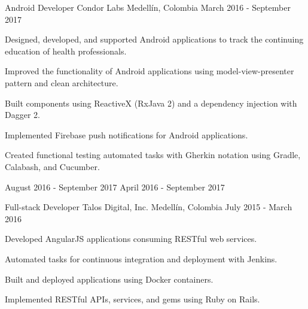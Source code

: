 \begin{cventries}
{    }
  \cventry
    {Android Developer}
    {Condor Labs}
    {Medellín, Colombia}
    {March 2016 - September 2017}
    {
      \begin{cvitems}
        \item {Designed, developed, and supported Android applications to track the continuing education of health professionals.}
        \item {Improved the functionality of Android applications using model-view-presenter pattern and clean architecture.}
        \item {Built components using ReactiveX (RxJava 2) and a dependency injection with Dagger 2.}
        \item {Implemented Firebase push notifications for Android applications.}
        \item {Created functional testing automated tasks with Gherkin notation using Gradle, Calabash, and Cucumber.}
      \end{cvitems}
      \begin{cvsubentries}
                      {August 2016 - September 2017}{}
                      {April 2016 - September 2017}{}
      \end{cvsubentries}
    }
  \cventry
    {Full-stack Developer}
    {Talos Digital, Inc.}
    {Medellín, Colombia}
    {July 2015 - March 2016}
    {
      \begin{cvitems}
        \item {Developed AngularJS applications consuming RESTful web services.}
        \item {Automated tasks for continuous integration and deployment with Jenkins.}
        \item {Built and deployed applications using Docker containers.}
        \item {Implemented RESTful APIs, services, and gems using Ruby on Rails.}

\end{cvitems}}
\end{cventries}
